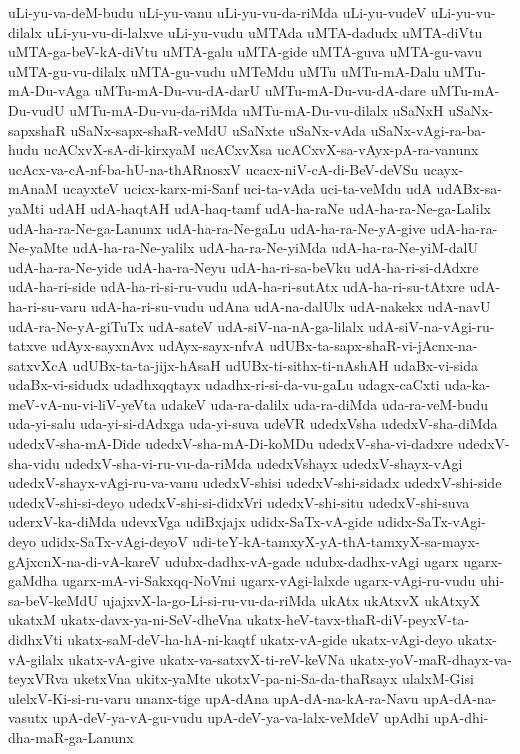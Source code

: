 {uLi-yu-va-deM-budu
uLi-yu-vanu
uLi-yu-vu-da-riMda
uLi-yu-vudeV
uLi-yu-vu-dilalx
uLi-yu-vu-di-lalxve
uLi-yu-vudu
uMTAda
uMTA-dadudx
uMTA-diVtu
uMTA-ga-beV-kA-diVtu
uMTA-galu
uMTA-gide
uMTA-guva
uMTA-gu-vavu
uMTA-gu-vu-dilalx
uMTA-gu-vudu
uMTeMdu
uMTu
uMTu-mA-Dalu
uMTu-mA-Du-vAga
uMTu-mA-Du-vu-dA-darU
uMTu-mA-Du-vu-dA-dare
uMTu-mA-Du-vudU
uMTu-mA-Du-vu-da-riMda
uMTu-mA-Du-vu-dilalx
uSaNxH
uSaNx-sapxshaR
uSaNx-sapx-shaR-veMdU
uSaNxte
uSaNx-vAda
uSaNx-vAgi-ra-ba-hudu
ucACxvX-sA-di-kirxyaM
ucACxvXsa
ucACxvX-sa-vAyx-pA-ra-vanunx
ucAcx-va-cA-nf-ba-hU-na-thARnosxV
ucacx-niV-cA-di-BeV-deVSu
ucayx-mAnaM
ucayxteV
ucicx-karx-mi-Sanf
uci-ta-vAda
uci-ta-veMdu
udA
udABx-sa-yaMti
udAH
udA-haqtAH
udA-haq-tamf
udA-ha-raNe
udA-ha-ra-Ne-ga-Lalilx
udA-ha-ra-Ne-ga-Lanunx
udA-ha-ra-Ne-gaLu
udA-ha-ra-Ne-yA-give
udA-ha-ra-Ne-yaMte
udA-ha-ra-Ne-yalilx
udA-ha-ra-Ne-yiMda
udA-ha-ra-Ne-yiM-dalU
udA-ha-ra-Ne-yide
udA-ha-ra-Neyu
udA-ha-ri-sa-beVku
udA-ha-ri-si-dAdxre
udA-ha-ri-side
udA-ha-ri-si-ru-vudu
udA-ha-ri-sutAtx
udA-ha-ri-su-tAtxre
udA-ha-ri-su-varu
udA-ha-ri-su-vudu
udAna
udA-na-dalUlx
udA-nakekx
udA-navU
udA-ra-Ne-yA-giTuTx
udA-sateV
udA-siV-na-nA-ga-lilalx
udA-siV-na-vAgi-ru-tatxve
udAyx-sayxnAvx
udAyx-sayx-nfvA
udUBx-ta-sapx-shaR-vi-jAcnx-na-satxvXcA
udUBx-ta-ta-jijx-hAsaH
udUBx-ti-sithx-ti-nAshAH
udaBx-vi-sida
udaBx-vi-sidudx
udadhxqqtayx
udadhx-ri-si-da-vu-gaLu
udagx-caCxti
uda-ka-meV-vA-nu-vi-liV-yeVta
udakeV
uda-ra-dalilx
uda-ra-diMda
uda-ra-veM-budu
uda-yi-salu
uda-yi-si-dAdxga
uda-yi-suva
udeVR
udedxVsha
udedxV-sha-diMda
udedxV-sha-mA-Dide
udedxV-sha-mA-Di-koMDu
udedxV-sha-vi-dadxre
udedxV-sha-vidu
udedxV-sha-vi-ru-vu-da-riMda
udedxVshayx
udedxV-shayx-vAgi
udedxV-shayx-vAgi-ru-va-vanu
udedxV-shisi
udedxV-shi-sidadx
udedxV-shi-side
udedxV-shi-si-deyo
udedxV-shi-si-didxVri
udedxV-shi-situ
udedxV-shi-suva
uderxV-ka-diMda
udevxVga
udiBxjajx
udidx-SaTx-vA-gide
udidx-SaTx-vAgi-deyo
udidx-SaTx-vAgi-deyoV
udi-teY-kA-tamxyX-yA-thA-tamxyX-sa-mayx-gAjxcnX-na-di-vA-kareV
udubx-dadhx-vA-gade
udubx-dadhx-vAgi
ugarx
ugarx-gaMdha
ugarx-mA-vi-Sakxqq-NoVmi
ugarx-vAgi-lalxde
ugarx-vAgi-ru-vudu
uhi-sa-beV-keMdU
ujajxvX-la-go-Li-si-ru-vu-da-riMda
ukAtx
ukAtxvX
ukAtxyX
ukatxM
ukatx-davx-ya-ni-SeV-dheVna
ukatx-heV-tavx-thaR-diV-peyxV-ta-didhxVti
ukatx-saM-deV-ha-hA-ni-kaqtf
ukatx-vA-gide
ukatx-vAgi-deyo
ukatx-vA-gilalx
ukatx-vA-give
ukatx-va-satxvX-ti-reV-keVNa
ukatx-yoV-maR-dhayx-va-teyxVRva
uketxVna
ukitx-yaMte
ukotxV-pa-ni-Sa-da-thaRsayx
ulalxM-Gisi
ulelxV-Ki-si-ru-varu
unanx-tige
upA-dAna
upA-dA-na-kA-ra-Navu
upA-dA-na-vasutx
upA-deV-ya-vA-gu-vudu
upA-deV-ya-va-lalx-veMdeV
upAdhi
upA-dhi-dha-maR-ga-Lanunx
}
